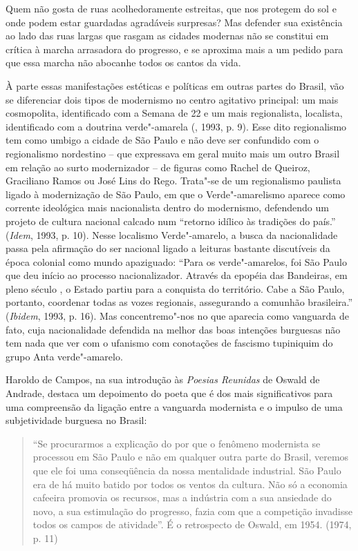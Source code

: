 Quem não gosta de ruas acolhedoramente estreitas, que nos protegem do
sol e onde podem estar guardadas agradáveis surpresas? Mas defender sua
existência ao lado das ruas largas que rasgam as cidades modernas não se
constitui em crítica à marcha arrasadora do progresso, e se aproxima
mais a um pedido para que essa marcha não abocanhe todos os cantos da
vida.

À parte essas manifestações estéticas e políticas em outras partes do
Brasil, vão se diferenciar dois tipos de modernismo no centro agitativo
principal: um mais cosmopolita, identificado com a Semana de 22 e um
mais regionalista, localista, identificado com a doutrina verde"-amarela
(, 1993, p. 9). Esse dito regionalismo tem como umbigo a cidade
de São Paulo e não deve ser confundido com o regionalismo nordestino --
que expressava em geral muito mais um outro Brasil em relação ao surto
modernizador -- de figuras como Rachel de Queiroz, Graciliano Ramos ou
José Lins do Rego. Trata"-se de um regionalismo paulista ligado à
modernização de São Paulo, em que o Verde"-amarelismo aparece como
corrente ideológica mais nacionalista dentro do modernismo, defendendo
um projeto de cultura nacional calcado num ``retorno idílico às
tradições do país.'' (\emph{Idem}, 1993, p. 10). Nesse localismo
Verde"-amarelo, a busca da nacionalidade passa pela afirmação do ser
nacional ligado a leituras bastante discutíveis da época colonial como
mundo apaziguado: ``Para os verde"-amarelos, foi São Paulo que deu início
ao processo nacionalizador. Através da epopéia das Bandeiras, em pleno
século , o Estado partiu para a conquista do território. Cabe a São
Paulo, portanto, coordenar todas as vozes regionais, assegurando a
comunhão brasileira.'' (\emph{Ibidem}, 1993, p. 16). Mas concentremo"-nos
no que aparecia como vanguarda de fato, cuja nacionalidade defendida na
melhor das boas intenções burguesas não tem nada que ver com o ufanismo
com conotações de fascismo tupiniquim do grupo Anta verde"-amarelo.

Haroldo de Campos, na sua introdução às \emph{Poesias Reunidas} de
Oswald de Andrade, destaca um depoimento do poeta que é dos mais
significativos para uma compreensão da ligação entre a vanguarda
modernista e o impulso de uma subjetividade burguesa no Brasil:

\begin{quote}
``Se procurarmos a explicação do por que o fenômeno modernista se
processou em São Paulo e não em qualquer outra parte do Brasil, veremos
que ele foi uma conseqüência da nossa mentalidade industrial. São Paulo
era de há muito batido por todos os ventos da cultura. Não só a economia
cafeeira promovia os recursos, mas a indústria com a sua ansiedade do
novo, a sua estimulação do progresso, fazia com que a competição
invadisse todos os campos de atividade''. É o retrospecto de Oswald, em
1954. (1974, p. 11)
\end{quote}

